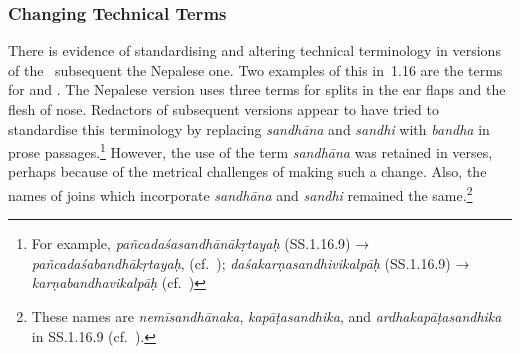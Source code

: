 






\subsubsection{Changing Technical Terms}

There is evidence of standardising and altering technical terminology in versions
of the \SS\ subsequent the Nepalese one. Two examples of this in \SS\,1.16 are the
terms for  and . The Nepalese
version uses three terms for  splits in the
ear flaps and the flesh of nose. Redactors of subsequent versions appear to have
tried to standardise this terminology by replacing \emph{sandhāna} and
\emph{sandhi} with \emph{bandha} in prose passages.\footnote{For example,
    \emph{pañcadaśasandhānākṛtayaḥ} (SS.1.16.9) → \emph{pañcadaśabandhākṛtayaḥ}, (cf.\
    ); \emph{daśakarṇasandhivikalpāḥ} (SS.1.16.9) →
    \emph{karṇabandhavikalpāḥ} (cf.\ \Su{1.16.10}{77})} However, the use of the term
    \emph{sandhāna} was retained in verses, perhaps because of the metrical challenges
    of making such a change. Also, the names of joins which incorporate
    \emph{sandhāna} and \emph{sandhi} remained the same.\footnote{These names are
        \emph{nemīsandhānaka}, \emph{kapāṭasandhika}, and \emph{ardhakapāṭasandhika} 
        in
        SS.1.16.9 (cf.\ ).}

